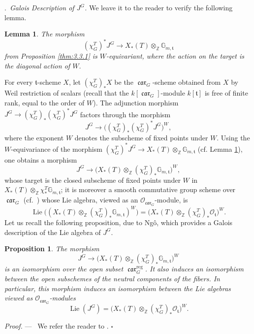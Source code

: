 \documentclass[12pt,a4paper,oneside,english,leqno]{smfart}
\makeatletter
\numberwithin{equation}{subsection}
\newcounter{theo}
\numberwithin{theo}{subsection}
\newenvironment{paragr}[1][]{\medskip\refstepcounter{subsection}%
  \par\noindent\hspace*{\parindent}\thesubsection.\ \emph{#1}%
  \@ifundefined{@empty}{}{}\ignorespaces}{\medskip}
\theoremstyle{plain}
\newtheorem{lemma}[theo]{Lemma}
\newtheorem{proposition}[theo]{Proposition}
\theoremstyle{definition}
\theoremstyle{remark}
\newenvironment{preuve}[1][]{\medskip\noindent\textit{Proof.} #1 ---\ }%
  {\hfill\ensuremath{\square}\medskip}
\DeclareMathOperator{\Lie}{Lie}
\DeclareMathOperator{\reg}{reg}
\DeclareMathOperator{\car}{\mathfrak{car}}
\newcommand{\ZZ}{\mathbb{Z}}
\newcommand{\oc}{\mathcal{O}}
\newcommand{\tgo}{\mathfrak{t}}
\makeatother
\begin{document}
\begin{paragr}[Galois Description of $J^G$.]\label{S:3.4} We leave it to the reader to verify the following lemma.

\begin{lemma}\label{thm:3.4.1}
The morphism
$$(\chi_G^T)^*J^G \to X_*(T)\otimes_\ZZ \mathbb{G}_{m,\tgo}$$
from Proposition \ref{thm:3.3.1} is $W$-equivariant, where the action on the target is the diagonal action of $W$.
\end{lemma}

For every $\tgo$-scheme $X$, let $(\chi_G^T)_*X$ be the $\car_G$-scheme obtained from $X$ by Weil restriction of scalars (recall that the $k[\car_G]$-module $k[\tgo]$ is free of finite rank, equal to the order of $W$). The adjunction morphism $J^G\to (\chi_G^T)_*(\chi_G^T)^*J^G$ factors through the morphism
$$J^G \longrightarrow \bigl((\chi_G^T)_*(\chi_G^T)^*J^G\bigr)^W,$$
where the exponent $W$ denotes the subscheme of fixed points under $W$. Using the $W$-equivariance of the morphism $(\chi_G^T)^*J^G \to X_*(T)\otimes_\ZZ \mathbb{G}_{m,\tgo}$ (cf. Lemma \ref{thm:3.4.1}), one obtains a morphism
\begin{equation}\label{eq:3.4.1}
  J^G \longrightarrow \bigl(X_*(T)\otimes_\ZZ (\chi_G^T)_*\mathbb{G}_{m,\tgo}\bigr)^W,
\end{equation}
whose target is the closed subscheme of fixed points under $W$ in $X_*(T)\otimes_\ZZ \chi^T_*\mathbb{G}_{m,\tgo}$; it is moreover a smooth commutative group scheme over $\car_G$ (cf.\ \cite[Lemma~2.4.1]{Ngo-lemme}) whose Lie algebra, viewed as an $\oc_{\car_G}$-module, is
$$\Lie\bigl((X_*(T)\otimes_\ZZ (\chi_G^T)_*\mathbb{G}_{m,\tgo})^W\bigr)=\bigl(X_*(T)\otimes_\ZZ (\chi_G^T)_*\oc_{\tgo}\bigr)^W.$$
Let us recall the following proposition, due to Ng\^o, which provides a Galois description of the Lie algebra of $J^G$.

\begin{proposition}\label{thm:3.4.2}
The morphism
$$J^G \longrightarrow \bigl(X_*(T)\otimes_\ZZ (\chi_G^T)_*\mathbb{G}_{m,\tgo}\bigr)^W$$
is an isomorphism over the open subset $\car_G^{\reg}$. It also induces an isomorphism between the open subschemes of the neutral components of the fibers. In particular, this morphism induces an isomorphism between the Lie algebras viewed as $\oc_{\car_G}$-modules
$$\Lie(J^G)=\bigl(X_*(T)\otimes_\ZZ (\chi_G^T)_*\oc_{\tgo}\bigr)^W.$$
\end{proposition}

\begin{preuve}
We refer the reader to \cite[Prop.~2.4.2 and Cor.~2.4.8]{Ngo-lemme}.
\end{preuve}
\end{paragr}
\end{document}
